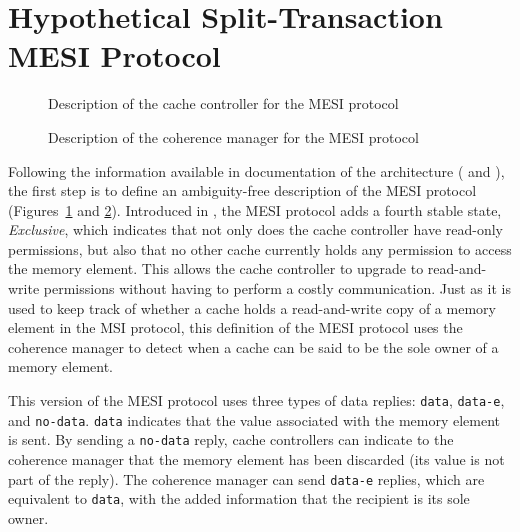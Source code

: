 \section{Hypothetical Split-Transaction MESI Protocol}
\label{sec:identification:mesi}
\begin{figure}[htb!]
\begin{center}
\resizebox{\textwidth}{!}{%

}
\end{center}
\caption{Description of the cache controller for the MESI protocol}
\label{fig:mesi_cc_table}
\end{figure}

\begin{figure}[htb!]
\begin{center}
\resizebox{\textwidth}{!}{%

}
\end{center}
\caption{Description of the coherence manager for the MESI protocol}
\label{fig:mesi_cmgr_table}
\end{figure}

Following the information available in documentation of the architecture
(\cite{T4240} and \cite{e6500}), the first step is to define an ambiguity-free
description of the MESI protocol (Figures~\ref{fig:mesi_cc_table} and
\ref{fig:mesi_cmgr_table}).  Introduced in
\cite{Papamarcos:1984:LCS:773453.808204}, the MESI protocol adds a fourth stable
state, \textit{Exclusive}, which indicates that not only does the cache
controller have read-only permissions, but also that no other cache currently
holds any permission to access the memory element. This allows the cache
controller to upgrade to read-and-write permissions without having to perform a
costly communication. Just as it is used to keep track of whether a cache holds
a read-and-write copy of a memory element in the MSI protocol, this definition
of the MESI protocol uses the coherence manager to detect when a cache can be
said to be the sole owner of a memory element.

This version of the MESI protocol uses three types of data replies:
\texttt{data}, \texttt{data-e}, and \texttt{no-data}. \texttt{data} indicates
that the value associated with the memory element is sent.  By sending a
\texttt{no-data} reply, cache controllers can indicate to the coherence manager
that the memory element has been discarded (its value is not part of the
reply). The coherence manager can send \texttt{data-e} replies, which are
equivalent to \texttt{data}, with the added information that the recipient is
its sole owner.


